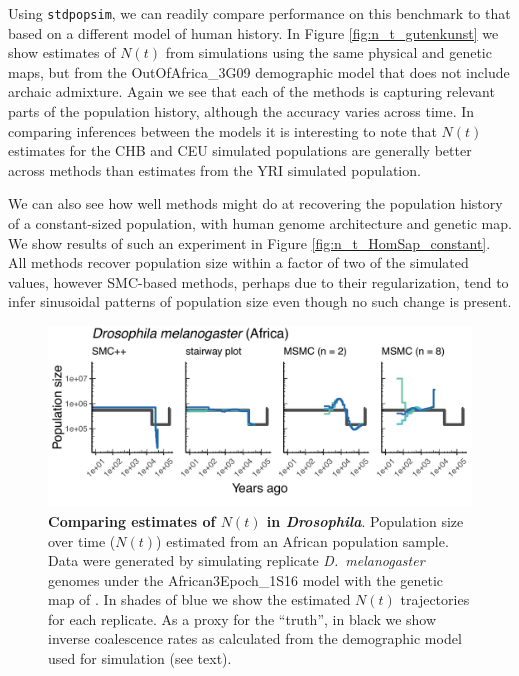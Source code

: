 \documentclass[12pt,halfline,a4paper]{ouparticle}
\newcommand{\stdpopsim}{\texttt{stdpopsim}\xspace}
\begin{document}
Using \stdpopsim, we can readily compare performance on this benchmark to
that based on a different model of human history. In Figure \ref{fig:n_t_gutenkunst} we show estimates of
$N(t)$ from simulations using the same physical and genetic maps, but from the OutOfAfrica\_3G09
demographic model that does not include archaic admixture. Again we see that each
of the methods is capturing relevant parts of the population history, although the
accuracy varies across time. In comparing inferences between the
models it is interesting to note that $N(t)$ estimates for the CHB and CEU
simulated populations are generally better across methods than estimates from the YRI
simulated population.

We can also
see how well methods might do at recovering the population history of a constant-sized population,
with human genome architecture and genetic map.
We show results of such an
experiment in Figure \ref{fig:n_t_HomSap_constant}.
All methods recover population size within a factor of two of the simulated values, however
SMC-based methods, perhaps due to their regularization, tend to infer sinusoidal
patterns of population size even though no such change is present.


\begin{figure}
\begin{center}
\includegraphics[width=0.8\linewidth]{display_items/DroMel_African3Epoch_1S16.pdf}
\caption{\textbf{Comparing estimates of $N(t)$ in \textit{Drosophila}}. Population
size over time ($N(t)$) estimated from an African population sample. Data were generated by simulating
replicate \textit{D.~melanogaster} genomes under the African3Epoch\_1S16 model \citep{sheehan2016deep}
with the genetic map of \cite{comeron2012many}. In shades of blue we show the estimated
$N(t)$ trajectories for each replicate.
As a proxy for the ``truth'', in black we show inverse coalescence rates
as calculated from the demographic model used for simulation (see text).
}
\label{fig:n_t_sheehan}
\end{center}
\end{figure}
\end{document}
